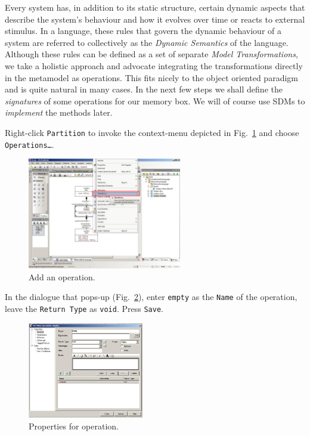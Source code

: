 \clearpage

Every system has, in addition to its static structure, certain dynamic aspects
that describe the system's behaviour and how it evolves over time or reacts to
external stimulus.
In a language, these rules that govern the dynamic behaviour of a system are
referred to collectively as the \emph{Dynamic Semantics} of the language.  
Although these rules can be defined as a set of separate \emph{Model
Transformations}, we take a holistic approach and advocate integrating the
transformations directly in the metamodel as operations.
This fits nicely to the object oriented paradigm and is quite natural in many
cases.  In the next few steps we shall define the \emph{signatures} of some
operations for our memory box.  We will of course use SDMs to \emph{implement}
the methods later.

Right-click \texttt{Partition} to invoke the context-menu depicted in
Fig.~\ref{fig:add_operation} and choose \texttt{Operations\ldots}.

\begin{figure}[htbp]
	\centering
  \includegraphics[width=0.6\textwidth]{pics/memBox35.png}
	\caption{Add an operation.}
	\label{fig:add_operation}
\end{figure}
 
In the dialogue that pops-up (Fig.~\ref{fig:operation_properties}), enter
\texttt{empty} as the \texttt{Name} of the operation, leave the \texttt{Return
Type} as \texttt{void}.  Press \texttt{Save}.
 
\begin{figure}[htbp]
	\centering
  \includegraphics[width=0.45\textwidth]{pics/memBox37.png}
	\caption{Properties for operation.}
	\label{fig:operation_properties}
\end{figure}

